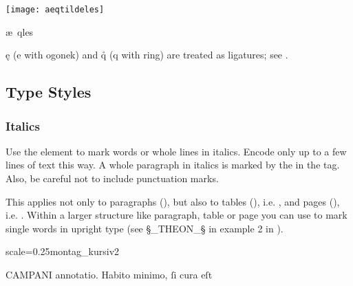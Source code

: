 \begin{example}

\texttt{[image: aeqtildeles]}

\vspace{-3mm}
\begin{typeLatin}
æ\bs~qles
\end{typeLatin}

\end{example}

\begin{note}
\k{e} (e with ogonek) and \r{q} (q with ring) are treated as ligatures; see .
\end{note}


\tocspace
\subsection{Type Styles}

\subsubsection{Italics}
\label{section italics}

\begin{mainrule}
Use the element  to mark words or whole lines in italics. Encode only up to a few lines of text this way. A whole paragraph in italics is marked by the  in the  tag. Also, be careful not to include punctuation marks.
\end{mainrule}

\begin{clarification}
  This applies not only to paragraphs (), but also to tables (), i.e. , and pages (), i.e. . %
  Within a larger  structure like paragraph, table or page you can use  to mark single words in upright type (see §_THEON_§ in example 2 in ).
\end{clarification}

\begin{sampleImageSmall}{scale=0.25}{montag_kursiv2}
\begin{typeLatin}
CAMPANI annotatio. Habito minimo, ſi cura eſt
\end{typeLatin}
\end{sampleImageSmall}

